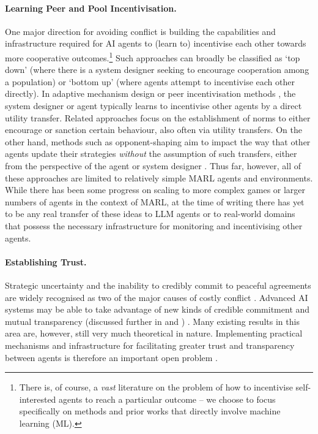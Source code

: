 \paragraph{Learning Peer and Pool Incentivisation.}
One major direction for avoiding conflict is building the {capabilities and infrastructure required for AI agents to (learn to) incentivise each other} towards more cooperative outcomes.\footnote{There is, of course, a \textit{vast} literature on the problem of how to incentivise self-interested agents to reach a particular outcome -- we choose to focus specifically on methods and prior works that directly involve machine learning (ML).}
Such approaches can broadly be classified as `top down' (where there is a system designer seeking to encourage cooperation among a population) or `bottom up' (where agents attempt to incentivise each other directly).
In adaptive mechanism design \citep{Pardoe2006,Zhang2008,Baumann2020,Yang2022,Zheng2022,Gerstgrasser2023} or peer incentivisation methods \citep{Yang2020,Lupu2020,Wang2021}, the system designer or agent typically learns to incentivise other agents by a direct utility transfer.
Related approaches focus on the establishment of norms \citep{Koester2020,Vinitsky2023,Oldenburg2024} to either encourage or sanction certain behaviour, also often via utility transfers.
On the other hand, methods such as opponent-shaping aim to impact the way that other agents update their strategies \emph{without} the assumption of such transfers, either from the perspective of the agent \citep{Foerster2018a,Willi2022,Lu2022} or system designer \citep{Balaguer2022a}.
Thus far, however, all of these approaches are limited to relatively simple MARL agents and environments.
While there has been some progress on scaling to more complex games \citep{Khan2023,Aghajohari2024,Meulemans2024, Serrino2019friendorfoe} or larger numbers of agents \citep{Souly2023,Meulemans2024} in the context of MARL, at the time of writing there has yet to be any real transfer of these ideas to LLM agents or to real-world domains that possess the necessary infrastructure for monitoring and incentivising other agents.

\paragraph{Establishing Trust.}
Strategic uncertainty and the inability to credibly commit to peaceful agreements are widely recognised as two of the major causes of costly conflict \citep{fearon1995rationalist,Blattman2023-uu}. 
Advanced AI systems may be able to take advantage of new kinds of {credible commitment and mutual transparency} (discussed further in  and ) \citep{McAfee1984,Howard1988,Conitzer2023,tennenholtz2004program,Barasz2014,Oesterheld2018,Critch2022,Sun2023,cooper2024characterising}.
Many existing results in this area are, however, still very much theoretical in nature.
Implementing practical mechanisms and infrastructure for facilitating greater trust and transparency between agents is therefore an important open problem \citep{Chan2025}.


